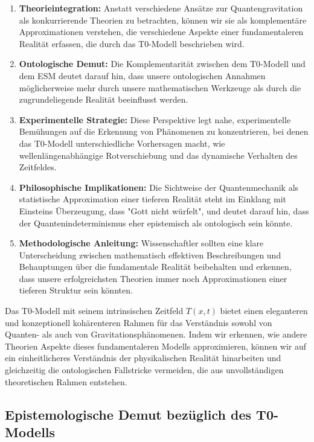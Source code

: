 \documentclass[12pt,a4paper]{article}
\newcommand{\Tfieldt}{T(x,t)}
\begin{document}
	\begin{enumerate}
		\item \textbf{Theorieintegration:} Anstatt verschiedene Ansätze zur Quantengravitation als konkurrierende Theorien zu betrachten, können wir sie als komplementäre Approximationen verstehen, die verschiedene Aspekte einer fundamentaleren Realität erfassen, die durch das T0-Modell beschrieben wird.
		
		\item \textbf{Ontologische Demut:} Die Komplementarität zwischen dem T0-Modell und dem ESM deutet darauf hin, dass unsere ontologischen Annahmen möglicherweise mehr durch unsere mathematischen Werkzeuge als durch die zugrundeliegende Realität beeinflusst werden.
		
		\item \textbf{Experimentelle Strategie:} Diese Perspektive legt nahe, experimentelle Bemühungen auf die Erkennung von Phänomenen zu konzentrieren, bei denen das T0-Modell unterschiedliche Vorhersagen macht, wie wellenlängenabhängige Rotverschiebung und das dynamische Verhalten des Zeitfeldes.
		
		\item \textbf{Philosophische Implikationen:} Die Sichtweise der Quantenmechanik als statistische Approximation einer tieferen Realität steht im Einklang mit Einsteins Überzeugung, dass "Gott nicht würfelt", und deutet darauf hin, dass der Quantenindeterminismus eher epistemisch als ontologisch sein könnte.
		
		\item \textbf{Methodologische Anleitung:} Wissenschaftler sollten eine klare Unterscheidung zwischen mathematisch effektiven Beschreibungen und Behauptungen über die fundamentale Realität beibehalten und erkennen, dass unsere erfolgreichsten Theorien immer noch Approximationen einer tieferen Struktur sein könnten.
	\end{enumerate}
	
	Das T0-Modell mit seinem intrinsischen Zeitfeld $\Tfieldt$ bietet einen eleganteren und konzeptionell kohärenteren Rahmen für das Verständnis sowohl von Quanten- als auch von Gravitationsphänomenen. Indem wir erkennen, wie andere Theorien Aspekte dieses fundamentaleren Modells approximieren, können wir auf ein einheitlicheres Verständnis der physikalischen Realität hinarbeiten und gleichzeitig die ontologischen Fallstricke vermeiden, die aus unvollständigen theoretischen Rahmen entstehen.
	
	\subsection{Epistemologische Demut bezüglich des T0-Modells}
	\label{subsec:t0_humility}
	
\end{document}
